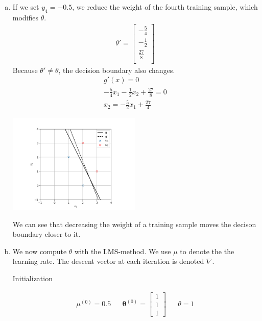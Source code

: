 \documentclass[a4paper, 10pt, twoside]{article}
\begin{document}
\begin{enumerate}[a)]
    \item If we set $y_4=-0.5$, we reduce the weight of the fourth training sample, which modifies $\theta$.
          \begin{align*}
              \theta' =
              \begin{bmatrix}
                  -\frac{5}{4} \\
                  -\frac{1}{2} \\
                  \frac{27}{8} \\
              \end{bmatrix}
          \end{align*}
          Because $\theta' \neq \theta$, the decision boundary also changes.
          \begin{align*}
              g'(x) = 0                                             \\
              -\frac{5}{4} x_1 - \frac{1}{2} x_2 + \frac{27}{8} = 0 \\
              x_2 = -\frac{5}{2} x_1 + \frac{27}{4}
          \end{align*}
          \begin{center}
              \includegraphics[width=0.5\textwidth]{img/graph3.png}
          \end{center}
          We can see that decreasing the weight of a training sample moves the decison boundary closer to it.

    \item We now compute $\theta$ with the LMS-method. We use $\mu$ to denote the the learning rate. The descent vector at each iteration is denoted $\nabla$.

          Initialization

          \begin{align*}
              \mu^{(0)} = 0.5
               &  &
              \bm{\theta}^{(0)} =
              \begin{bmatrix}
                  1 \\ 1 \\ 1
              \end{bmatrix}
               &  &
              \theta = 1
          \end{align*}


\end{enumerate}
\end{document}
